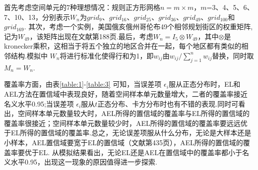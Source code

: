 \documentclass[a4paper,c5size,onecolumn,twoside,cap,Chinese]{APSart}
\begin{document}
首先考虑空间单元的7种理想情况：规则正方形网格$n=m×m$，$m$=3、4、5、6、7、10、13，分别表示$W_n$为$grid_9$、$grid_{16}$、$grid_{25}$、$grid_{36}$、$grid_{49}$、$grid_{100}$和$grid_{169}$.
其次，考虑一个实例，美国俄亥俄州哥伦布49个相邻规划街区的权重矩阵,记为$W_{49}$，该矩阵出现在文献第188页.最后，考虑$W_n=I_5\otimes W_{49}$，其中$\otimes$是kronecker乘积，这相当于将五个独立的地区合并在一起，每个地区都有类似的相邻结构.模拟中 $W_n$将进行标准化使得行和为1，即$w_{ij}$由$w_{ij}/\sum_{j=1}^{n}w_{ij}$替换，同时取$M_n=W_n$. 


覆盖率方面，由表\ref{table:1}-\ref{table:3} 可知，当误差项 $\epsilon_{i}$服从正态分布时，EL和AEL方法在置信域中表现良好，随着空间样本单元数量增大，二者的覆盖率接近名义水平0.95;当误差项 $\epsilon_{i}$服从$t$正态分布、卡方分布时也有不错的表现.同时可看出，空间样本单元数量较大时，AEL所得的置信域的覆盖率与EL所得的置信域的覆盖率很接近；空间样本单元数量较少时，AEL所得的置信域的覆盖率要远远优于EL所得的置信域的覆盖率.总之，无论误差项服从什么分布，无论是大样本还是小样本，AEL置信域要宽于EL的置信域（文献第435页），AEL所得的置信域的覆盖率要优于EL. 从模拟结果看出，无论EL还是AEL在置信域中的覆盖率都小于名义水平0.95，出现这一现象的原因值得进一步探索.
\end{document}
